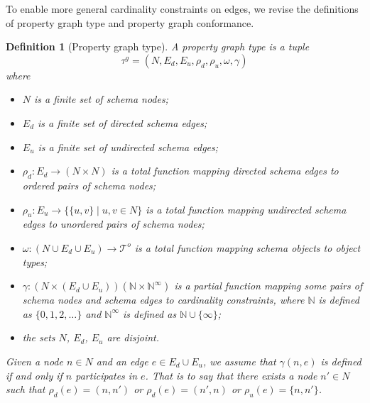 \documentclass[a4paper]{article}
\makeatletter
\newtheorem{definition}[theorem]{Definition}
\newcommand{\N}{\mathbb{N}}
\newcommand{\pto}{}%
\DeclareRobustCommand{\pto}{\mathrel{\mathpalette\p@to@gets\to}}
\newcommand{\p@to@gets}[2]{%
  \ooalign{\hidewidth$\m@th#1\mapstochar\mkern5mu$\hidewidth\cr$\m@th#1\to$\cr}%
}
\newcommand{\otypes}{\mathcal{T}^o}
\newcommand{\gtype}{\tau^g}
\makeatother
\begin{document}
To enable more general cardinality constraints on edges, we revise the definitions of property graph type and property graph conformance.

\begin{definition}[Property graph type]
  A \emph{property graph type} is a tuple \[\gtype = (N, E_d, E_u, \rho_d, \rho_u, \omega, \gamma)\] where
  \begin{itemize}
    \item $N$ is a finite set of schema nodes;
    \item $E_d$ is a finite set of directed schema edges;
    \item $E_u$ is a finite set of undirected schema edges;
    \item $\rho_d : E_d \to (N \times N)$ is a total function mapping directed schema edges to ordered pairs of schema nodes;
    \item $\rho_u : E_u \to \{\{u, v\} \mid u, v \in N\}$ is a total function mapping undirected schema edges to unordered pairs of schema nodes;
    \item $\omega : (N \cup E_d \cup E_u) \to \otypes$ is a total function mapping schema objects to object types;
    \item $\gamma : (N \times (E_d \cup E_u)) \pto (\N \times \N^\infty)$ is a partial function mapping some pairs of schema nodes and schema edges to cardinality constraints, where $\N$ is defined as $\{0, 1, 2, \ldots\}$ and $\N^\infty$ is defined as $\N \cup \{\infty\}$;
    \item the sets $N$, $E_d$, $E_u$ are disjoint.
  \end{itemize}


  Given a node $n \in N$ and an edge $e \in E_d \cup E_u$, we assume that $\gamma(n, e)$ is defined if and only if $n$ \emph{participates} in $e$. That is to say that there exists a node $n' \in N$ such that $\rho_d(e) = (n, n')$ or $\rho_d(e) = (n', n)$ or $\rho_u(e) = \{n, n'\}$.
\end{definition}
\end{document}
